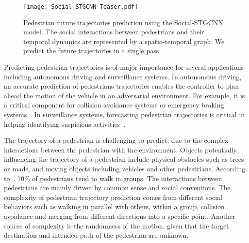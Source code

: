 \documentclass[10pt,twocolumn,letterpaper]{article}
\newcommand*{\ours}{Social-STGCNN }
\begin{document}
\label{sec:intro}
\let\thefootnote\relax{}


\begin{figure}[ht]
\begin{center}
\texttt{[image: Social-STGCNN-Teaser.pdf]}
   \caption {Pedestrian future trajectories prediction using the \ours model. The social interactions between pedestrians and their temporal dynamics are represented by a spatio-temporal graph. We predict the future trajectories in a single pass.}
   \end{center}
\label{fig:teaser}
\end{figure}

Predicting pedestrian trajectories is of major importance for several applications including autonomous driving and surveillance systems. In autonomous driving, an accurate prediction of pedestrians trajectories enables the controller to plan ahead the motion of the vehicle in an adversarial environment. For example, it is a critical component for collision avoidance systems or emergency braking systems~\cite{bai2015intention,morotomi2014collision,luo2018porca,raksincharoensak2016motion}. In surveillance systems, forecasting pedestrian trajectories is critical in helping identifying suspicious activities~\cite{luber2010people,yasuno2004pedestrian,musleh2010identifying}.

The trajectory of a pedestrian is challenging to predict, due to the complex interactions between the pedestrian with the environment. Objects potentially influencing the trajectory of a pedestrian include physical obstacles such as trees or roads, and moving objects including vehicles and other pedestrians. According to~\cite{moussaid2010walking}, 70\% of pedestrians tend to walk in groups. The interactions between pedestrians are mainly driven by common sense and social conventions. The complexity of pedestrian trajectory prediction comes from different social behaviors such as walking in parallel with others, within a group, collision avoidance and merging from different directions into a specific point. Another source of complexity is the randomness of the motion, given that the target destination and intended path of the pedestrian are unknown.
\end{document}
